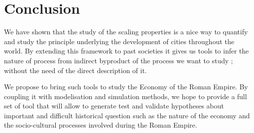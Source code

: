 \documentclass[a4paper,11pt]{article}
\begin{document}
\section{Conclusion}

We have shown that the study of the scaling properties is a nice way to quantify and study the principle underlying the development of cities throughout the world. By extending this framework to past societies it gives us tools to infer the nature of process from indirect byproduct of the process we want to study ; without the need of the direct description of it.  

We propose to bring such tools to study the Economy of the Roman Empire.  By coupling it with modelisation and simulation methods, we hope to provide a full set of tool that will allow to generate test and validate hypotheses about important and difficult historical question such as the nature of the economy and the socio-cultural processes involved  during the Roman Empire.




\end{document}
